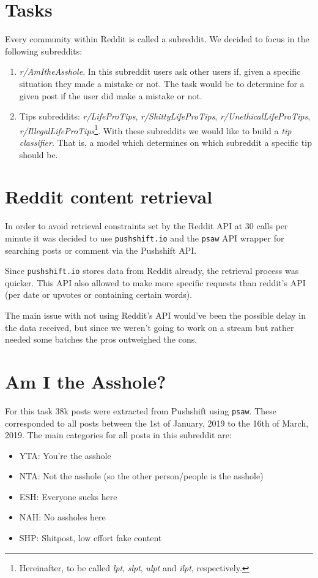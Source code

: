 \documentclass[11pt,a4paper]{article}
\begin{document}
\section{Tasks}
\label{sec:tasks}
Every community within Reddit is called a subreddit. We decided to focus in the
following subreddits:
\begin{enumerate}
	\item \textit{r/AmItheAsshole}. In this subreddit users ask other users if, given a
	specific situation they made a mistake or not. The task would be to determine for a
	given post if the user did make a mistake or not.
	\item Tips subreddits: \textit{r/LifeProTips}, \textit{r/ShittyLifeProTips},
	\textit{r/UnethicalLifeProTips}, \textit{r/IllegalLifeProTips}\footnote{Hereinafter, to be
	called \textit{lpt}, \textit{slpt}, \textit{ulpt} and \textit{ilpt}, respectively.}. With these
	subreddits we would like to build a \textit{tip classifier}. That is, a model which
	determines on which subreddit a specific tip should be. 
\end{enumerate}

\section{Reddit content retrieval}
\label{sec:reddit_api}
In order to avoid retrieval constraints set by the Reddit API at 30 calls per minute it was decided to use \texttt{pushshift.io} and the \texttt{psaw} API wrapper for searching posts or comment via the Pushshift API.

Since \texttt{pushshift.io} stores data from Reddit already, the retrieval process was quicker. This API also allowed to make more specific requests than reddit's API (per date or upvotes or containing certain words). 

The main issue with not using Reddit's API would've been the possible delay in the data received, but since we weren't going to work on a stream but rather needed some batches the pros outweighed the cons. 


\section{Am I the Asshole?}
\label{sec:aita}
For this task $38$k posts were extracted from Pushshift using \texttt{psaw}. These corresponded to all posts between the 1st of January, 2019 to the 16th of March, 2019. The main categories for all posts in this subreddit are:
\begin{itemize}  
\item YTA: You're the asshole
\item NTA: Not the asshole (so the other person/people is the asshole)
\item ESH: Everyone sucks here
\item NAH: No assholes here
\item SHP: Shitpost, low effort fake content
\end{itemize}
\end{document}

